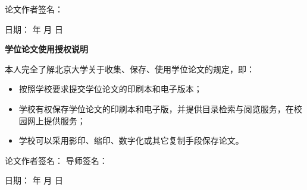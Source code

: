 \documentclass[12pt, a4paper]{ctexart}
\begin{document}
\hfill 论文作者签名：\underline{\hspace{3cm}} 

\vspace{2em} %

\hfill 日期：\underline{\hspace{2cm}} 年 \underline{\hspace{1cm}} 月 \underline{\hspace{1cm}} 日

\vspace{2em} %

\begin{center}
    \textbf{学位论文使用授权说明}
\end{center}

\vspace{1em} %

本人完全了解北京大学关于收集、保存、使用学位论文的规定，即：
\begin{itemize}
    \item 按照学校要求提交学位论文的印刷本和电子版本；
    \item 学校有权保存学位论文的印刷本和电子版，并提供目录检索与阅览服务，在校园网上提供服务；
    \item 学校可以采用影印、缩印、数字化或其它复制手段保存论文。
\end{itemize}

\vspace{2em} %

\hfill 论文作者签名：\underline{\hspace{3cm}} \hspace{2em} 导师签名：\underline{\hspace{3cm}}

\vspace{1em} %

\hfill 日期：\underline{\hspace{2cm}} 年 \underline{\hspace{1cm}} 月 \underline{\hspace{1cm}} 日      
\end{document}
